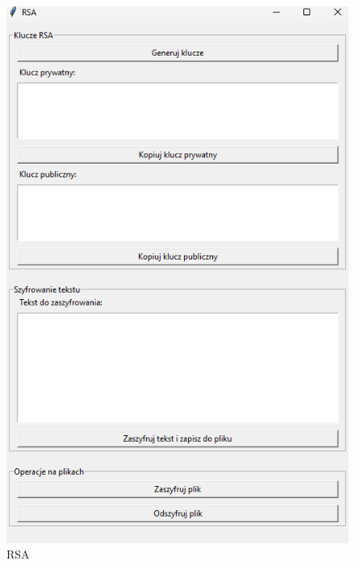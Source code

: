 \documentclass[12pt,a4paper]{article}
\begin{document}
\begin{figure}[!htb]
\begin{center}
\includegraphics[scale=0.45]{pictures/rsa.png}
\caption{RSA}
\label{fig:RSA}
\end{center}
\end{figure}


\newpage
\end{document}
